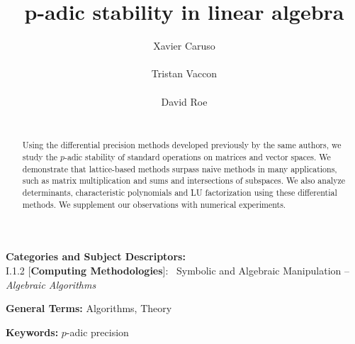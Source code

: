 \documentclass{sig-alternate}
\begin{document}
\newtheorem{theo}{Theorem}[section]
\newtheorem{lem}[theo]{Lemma}
\newtheorem{prop}[theo]{Proposition}
\newtheorem{cor}[theo]{Corollary}
\newtheorem{quest}[theo]{Question}
\newtheorem{conj}[theo]{Conjecture}
\theoremstyle{definition}
\newtheorem{rem}[theo]{Remark}
\newtheorem{ex}[theo]{Example}
\newtheorem{deftn}[theo]{Definition}

\title{p-adic stability in linear algebra}

\author{
\alignauthor Xavier Caruso\\
  \\
\alignauthor Tristan Vaccon\\
  \\
\alignauthor David Roe \\
  \\
}

\maketitle

\begin{abstract}
Using the differential precision methods developed previously by the same authors,
we study the $p$-adic stability of standard operations on matrices and vector 
spaces. We demonstrate that lattice-based methods surpass naive methods in many
applications, such as matrix multiplication and sums and intersections of subspaces.
We also analyze determinants, characteristic polynomials and LU factorization using these differential methods.
We supplement our observations with numerical experiments.
\end{abstract}

\vspace{1mm}
 \noindent
 {\bf Categories and Subject Descriptors:} \\
\noindent I.1.2 [{\bf Computing Methodologies}]:{~} Symbolic and Algebraic
  Manipulation -- \emph{Algebraic Algorithms}

 \vspace{1mm}
 \noindent
 {\bf General Terms:} Algorithms, Theory

 \vspace{1mm}
 \noindent
 {\bf Keywords:} $p$-adic precision
\medskip
\end{document}
